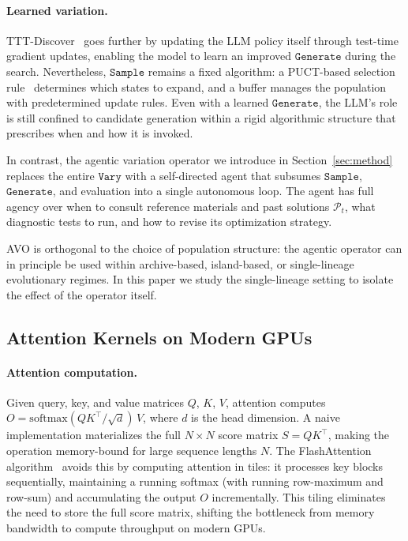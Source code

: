 \documentclass{article}
\begin{document}
\paragraph{Learned variation.}
TTT-Discover~\citep{yuksekgonul2025tttdiscover} goes further by updating the LLM policy itself through test-time gradient updates, enabling the model to learn an improved $\texttt{Generate}$ during the search.
Nevertheless, $\texttt{Sample}$ remains a fixed algorithm: a PUCT-based selection rule~\citep{silver2016alphago} determines which states to expand, and a buffer manages the population with predetermined update rules.
Even with a learned $\texttt{Generate}$, the LLM's role is still confined to candidate generation within a rigid algorithmic structure that prescribes when and how it is invoked.

In contrast, the agentic variation operator we introduce in Section~\ref{sec:method} replaces the entire $\texttt{Vary}$ with a self-directed agent that subsumes $\texttt{Sample}$, $\texttt{Generate}$, and evaluation into a single autonomous loop.
The agent has full agency over when to consult reference materials and past solutions $\mathcal{P}_t$, what diagnostic tests to run, and how to revise its optimization strategy.

AVO is orthogonal to the choice of population structure: the agentic operator can in principle be used within archive-based, island-based, or single-lineage evolutionary regimes.
In this paper we study the single-lineage setting to isolate the effect of the operator itself.

\subsection{Attention Kernels on Modern GPUs}
\label{sec:background_attention}

\paragraph{Attention computation.}
Given query, key, and value matrices $Q$, $K$, $V$, attention computes $O = \mathrm{softmax}(QK^\top / \sqrt{d})\, V$, where $d$ is the head dimension.
A naive implementation materializes the full $N \times N$ score matrix $S = QK^\top$, making the operation memory-bound for large sequence lengths $N$.
The FlashAttention algorithm~\citep{dao2022flashattention} avoids this by computing attention in tiles: it processes key blocks sequentially, maintaining a running softmax (with running row-maximum and row-sum) and accumulating the output $O$ incrementally.
This tiling eliminates the need to store the full score matrix, shifting the bottleneck from memory bandwidth to compute throughput on modern GPUs.
\end{document}
